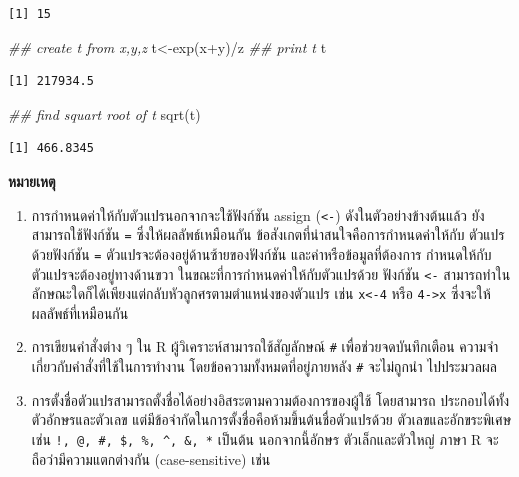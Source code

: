\documentclass[
  a4paper,
]{book}
\newenvironment{Shaded}{\begin{snugshade}}{\end{snugshade}}
\newcommand{\DocumentationTok}[1]{\textcolor[rgb]{0.37,0.37,0.37}{\textit{#1}}}
\newcommand{\FunctionTok}[1]{\textcolor[rgb]{0.28,0.35,0.67}{#1}}
\newcommand{\NormalTok}[1]{\textcolor[rgb]{0.00,0.23,0.31}{#1}}
\newcommand{\OtherTok}[1]{\textcolor[rgb]{0.00,0.23,0.31}{#1}}
\newcommand{\SpecialCharTok}[1]{\textcolor[rgb]{0.37,0.37,0.37}{#1}}
\begin{document}
\begin{verbatim}
[1] 15
\end{verbatim}

\begin{Shaded}
\begin{Highlighting}[]
\DocumentationTok{\#\# create t from x,y,z}
\NormalTok{t}\OtherTok{\textless{}{-}}\FunctionTok{exp}\NormalTok{(x}\SpecialCharTok{+}\NormalTok{y)}\SpecialCharTok{/}\NormalTok{z}
\DocumentationTok{\#\# print t}
\NormalTok{t}
\end{Highlighting}
\end{Shaded}

\begin{verbatim}
[1] 217934.5
\end{verbatim}

\begin{Shaded}
\begin{Highlighting}[]
\DocumentationTok{\#\# find squart root of t}
\FunctionTok{sqrt}\NormalTok{(t)}
\end{Highlighting}
\end{Shaded}

\begin{verbatim}
[1] 466.8345
\end{verbatim}

\textbf{หมายเหตุ}

\begin{enumerate}
\def\labelenumi{\arabic{enumi}.}
\item
  การกำหนดค่าให้กับตัวแปรนอกจากจะใช้ฟังก์ชัน assign (\texttt{\textless{}-})
  ดังในตัวอย่างข้างต้นแล้ว ยัง สามารถใช้ฟังก์ชัน \texttt{=} ซึ่งให้ผลลัพธ์เหมือนกัน
  ข้อสังเกตที่น่าสนใจคือการกำหนดค่าให้กับ ตัวแปรด้วยฟังก์ชัน \texttt{=}
  ตัวแปรจะต้องอยู่ด้านซ้ายของฟังก์ชัน และค่าหรือข้อมูลที่ต้องการ
  กำหนดให้กับตัวแปรจะต้องอยู่ทางด้านขวา ในขณะที่การกำหนดค่าให้กับตัวแปรด้วย ฟังก์ชัน
  \texttt{\textless{}-}
  สามารถทำในลักษณะใดก็ได้เพียงแต่กลับหัวลูกศรตามตำแหน่งของตัวแปร เช่น
  \texttt{x\textless{}-4} หรือ \texttt{4-\textgreater{}x}
  ซึ่งจะให้ผลลัพธ์ที่เหมือนกัน
\item
  การเขียนคำสั่งต่าง ๆ ใน R ผู้วิเคราะห์สามารถใช้สัญลักษณ์ \texttt{\#}
  เพื่อช่วยจดบันทึกเตือน ความจำเกี่ยวกับคำสั่งที่ใช้ในการทำงาน โดยข้อความทั้งหมดที่อยู่ภายหลัง
  \texttt{\#} จะไม่ถูกนำ ไปประมวลผล
\item
  การตั้งชื่อตัวแปรสามารถตั้งชื่อได้อย่างอิสระตามความต้องการของผู้ใช้ โดยสามารถ
  ประกอบได้ทั้งตัวอักษรและตัวเลข แต่มีข้อจำกัดในการตั้งชื่อคือห้ามขึ้นต้นชื่อตัวแปรด้วย
  ตัวเลขและอักขระพิเศษ เช่น \texttt{!,\ @,\ \#,\ \$,\ \%,\ \^{},\ \&,\ *}
  เป็นต้น นอกจากนี้อักษร ตัวเล็กและตัวใหญ่ ภาษา R จะถือว่ามีความแตกต่างกัน
  (case-sensitive) เช่น
\end{enumerate}
\end{document}
